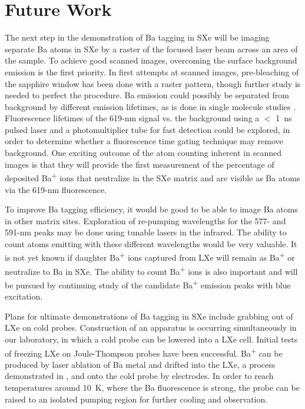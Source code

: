 \section{Future Work}
\label{sec:future}

The next step in the demonstration of Ba tagging in SXe will be imaging separate Ba atoms in SXe by a raster of the focused laser beam across an area of the sample.  To achieve good scanned images, overcoming the surface background emission is the first priority.  In first attempts at scanned images, pre-bleaching of the sapphire window has been done with a raster pattern, though further study is needed to perfect the procedure.  Ba emission could possibly be separated from background by different emission lifetimes, as is done in single molecule studies \cite{singleMoleculePulsed}.  Fluorescence lifetimes of the 619-nm signal vs. the background using a $<$ 1~ns pulsed laser and a photomultiplier tube for fast detection could be explored, in order to determine whether a fluorescence time gating technique may remove background.  One exciting outcome of the atom counting inherent in scanned images is that they will provide the first measurement of the percentage of deposited Ba\textsuperscript{+} ions that neutralize in the SXe matrix and are visible as Ba atoms via the 619-nm fluorescence.

To improve Ba tagging efficiency, it would be good to be able to image Ba atoms in other matrix sites.  Exploration of re-pumping wavelengths for the 577- and 591-nm peaks may be done using tunable lasers in the infrared.  The ability to count atoms emitting with these different wavelengths would be very valuable.  It is not yet known if daughter Ba\textsuperscript{+} ions captured from LXe will remain as Ba\textsuperscript{+} or neutralize to Ba in SXe.  The ability to count Ba\textsuperscript{+} ions is also important and will be pursued by continuing study of the candidate Ba\textsuperscript{+} emission peaks with blue excitation.

Plans for ultimate demonstrations of Ba tagging in SXe include grabbing out of LXe on cold probes.  Construction of an apparatus is occurring simultaneously in our laboratory, in which a cold probe can be lowered into a LXe cell.  Initial tests of freezing LXe on Joule-Thompson probes have been successful.  Ba\textsuperscript{+} can be produced by laser ablation of Ba metal and drifted into the LXe, a process demonstrated in \cite{Kendy}, and onto the cold probe by electrodes.  In order to reach temperatures around 10~K, where the Ba fluorescence is strong, the probe can be raised to an isolated pumping region for further cooling and observation.

